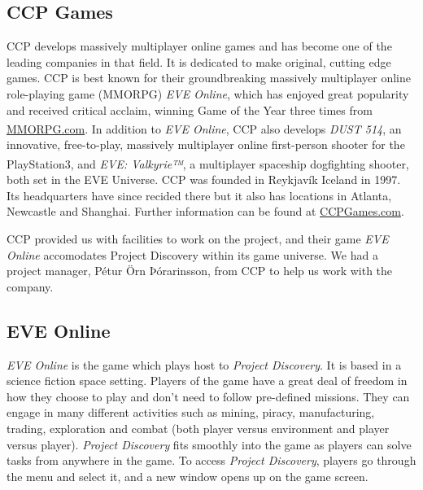 \subsection{CCP Games}

CCP develops massively multiplayer online games and has become one of the leading companies in that field. It is dedicated to make original, cutting edge games. CCP is best known for their groundbreaking massively multiplayer online role-playing game (MMORPG) \emph{EVE Online}, which has enjoyed great popularity and received critical acclaim, winning Game of the Year three times from \href{http://www.mmorpg.com/}{MMORPG.com}. In addition to \emph{EVE Online}, CCP also develops \emph{DUST 514\textsuperscript{\textregistered}}, an innovative, free-to-play, massively multiplayer online first-person shooter for the PlayStation\textsuperscript{\textregistered}3, and \emph{EVE: Valkyrie™}, a multiplayer spaceship dogfighting shooter, both set in the EVE Universe. CCP was founded in Reykjavík Iceland in 1997. Its headquarters have since recided there but it also has locations in Atlanta, Newcastle and Shanghai. Further information can be found at \href{http://www.ccpgames.com/}{CCPGames.com}.

CCP provided us with facilities to work on the project, and their game \emph{EVE Online} accomodates Project Discovery within its game universe. We had a project manager, Pétur Örn Þórarinsson, from CCP to help us work with the company. 

\subsection{EVE Online}
\emph{EVE Online} is the game which plays host to \emph{Project Discovery}. It is based in a science fiction space setting. Players of the game have a great deal of freedom in how they choose to play and don't need to follow pre-defined missions. They can engage in many different activities such as mining, piracy, manufacturing, trading, exploration and combat (both player versus environment and player versus player). \emph{Project Discovery} fits smoothly into the game as players can solve tasks from anywhere in the game. To access \emph{Project Discovery}, players go through the menu and select it, and a new window opens up on the game screen.
